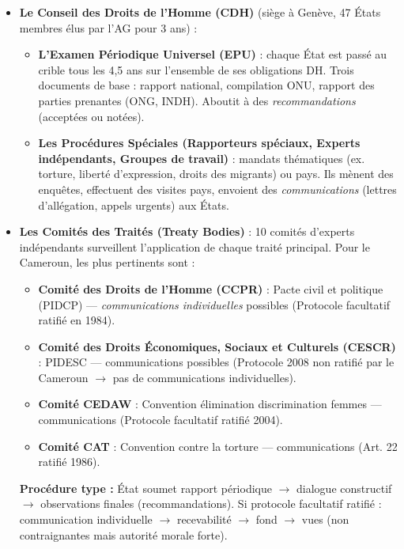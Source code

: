 \documentclass[11pt]{article}
\begin{document}
\begin{itemize}
  \item \textbf{Le Conseil des Droits de l'Homme (CDH)} (siège à Genève, 47 États membres élus par l'AG pour 3 ans) :
    \begin{itemize}
      \item \textbf{L'Examen Périodique Universel (EPU)} : chaque État est passé au crible tous les 4,5 ans sur l'ensemble de ses obligations DH. Trois documents de base : rapport national, compilation ONU, rapport des parties prenantes (ONG, INDH). Aboutit à des \emph{recommandations} (acceptées ou notées).
      \item \textbf{Les Procédures Spéciales (Rapporteurs spéciaux, Experts indépendants, Groupes de travail)} : mandats thématiques (ex. torture, liberté d'expression, droits des migrants) ou pays. Ils mènent des enquêtes, effectuent des visites pays, envoient des \emph{communications} (lettres d'allégation, appels urgents) aux États.
    \end{itemize}
  \item \textbf{Les Comités des Traités (Treaty Bodies)} : 10 comités d'experts indépendants surveillent l'application de chaque traité principal. Pour le Cameroun, les plus pertinents sont :
    \begin{itemize}
      \item \textbf{Comité des Droits de l'Homme (CCPR)} : Pacte civil et politique (PIDCP) — \emph{communications individuelles} possibles (Protocole facultatif ratifié en 1984).
      \item \textbf{Comité des Droits Économiques, Sociaux et Culturels (CESCR)} : PIDESC — communications possibles (Protocole 2008 non ratifié par le Cameroun $\to$ pas de communications individuelles).
      \item \textbf{Comité CEDAW} : Convention élimination discrimination femmes — communications (Protocole facultatif ratifié 2004).
      \item \textbf{Comité CAT} : Convention contre la torture — communications (Art. 22 ratifié 1986).
    \end{itemize}
    \textbf{Procédure type :} État soumet rapport périodique $\to$ dialogue constructif $\to$ observations finales (recommandations). Si protocole facultatif ratifié : communication individuelle $\to$ recevabilité $\to$ fond $\to$ vues (non contraignantes mais autorité morale forte).
\end{itemize}
\end{document}
